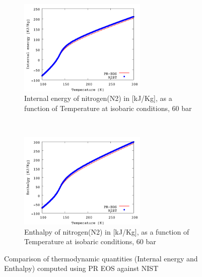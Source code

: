 \documentclass[11pt]{article}
\begin{document}
\begin{figure}[t!]
    \centering
    \begin{subfigure}[t]{0.5\textwidth}
        \centering
        \includegraphics[height=1.8in]{figures/N2_vsNIST_InternalEnergy.png}
        \caption{Internal energy of nitrogen(N2) in [kJ/Kg], as a function of Temperature at isobaric conditions, 60 bar}
    \end{subfigure}%
    ~ 
    \begin{subfigure}[t]{0.5\textwidth}
        \centering
        \includegraphics[height=1.8in]{figures/N2_vsNIST_Enthalpy.png}
        \caption{Enthalpy of nitrogen(N2) in [kJ/Kg], as a function of Temperature at isobaric conditions, 60 bar}
    \end{subfigure}
    \caption{Comparison of thermodynamic quantities (Internal energy and Enthalpy) computed using PR EOS against NIST}
    \label{fig:EnthalpyEnergyVsNIST}
\end{figure}

\cleardoublepage
\end{document}
